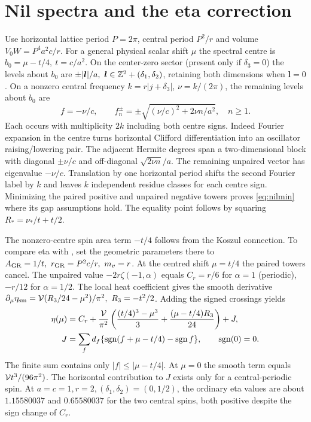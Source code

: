 \section{Nil spectra and the eta correction}\label{app:nil}
Use horizontal lattice period \(P=2\pi\), central period \(P^2/r\) and volume \(V_0W=P^4a^2c/r\). For a general physical scalar shift \(\mu\) the spectral centre is \(b_0=\mu-t/4,\ t=c/a^2\). On the center-zero sector (present only if \(\delta_3=0\)) the levels about \(b_0\) are \(\pm|\boldsymbol l|/a,\ \boldsymbol l\in\mathbb Z^2+(\delta_1,\delta_2)\), retaining both dimensions when \(\boldsymbol l=0\). On a nonzero central frequency \(k=r|j+\delta_3|\), \(\nu=k/(2\pi)\), the remaining levels about \(b_0\) are
\[
 f=-\nu/c,\qquad f_n^\pm=\pm\sqrt{(\nu/c)^2+2\nu n/a^2},\quad n\ge1.
\]
Each occurs with multiplicity \(2k\) including both centre signs. Indeed Fourier expansion in the centre turns horizontal Clifford differentiation into an oscillator raising/lowering pair. The adjacent Hermite degrees span a two-dimensional block with diagonal \(\pm\nu/c\) and off-diagonal \(\sqrt{2\nu n}/a\). The remaining unpaired vector has eigenvalue \(-\nu/c\). Translation by one horizontal period shifts the second Fourier label by \(k\) and leaves \(k\) independent residue classes for each centre sign. Minimizing the paired positive and unpaired negative towers proves \eqref{eq:nilmin} where its gap assumptions hold. The equality point follows by squaring \(R_*=\nu_*/t+t/2\).

The nonzero-centre spin area term \(-t/4\) follows from the Koszul connection. To compare eta with \cite[Thm.~12]{gornet}, set the geometric parameters there to \(A_{\rm GR}=1/t,\ r_{\rm GR}=P^2c/r,\ m_v=r\). At the centred shift \(\mu=t/4\) the paired towers cancel. The unpaired value \(-2r\zeta(-1,\alpha)\) equals \(C_r=r/6\) for \(\alpha=1\) (periodic), \(-r/12\) for \(\alpha=1/2\). The local heat coefficient gives the smooth derivative \(\partial_\mu\eta_{\rm sm}=\mathcal V(R_3/24-\mu^2)/\pi^2,\ R_3=-t^2/2\). Adding the signed crossings yields
\begin{align*}
 \eta(\mu)&=C_r+\frac{\mathcal V}{\pi^2}\left(\frac{(t/4)^3-\mu^3}{3}
                     +\frac{(\mu-t/4)R_3}{24}\right)+J,\\
 J&=\sum_f d_f\{\operatorname{sgn}(f+\mu-t/4)-\operatorname{sgn} f\},\qquad \operatorname{sgn}(0)=0 .
\end{align*}
The finite sum contains only \(|f|\le|\mu-t/4|\). At \(\mu=0\) the smooth term equals \(\mathcal V t^3/(96\pi^2)\). The horizontal contribution to \(J\) exists only for a central-periodic spin. At \(a=c=1,r=2,(\delta_1,\delta_2)=(0,1/2)\), the ordinary eta values are about \(1.15580037\) and \(0.65580037\) for the two central spins, both positive despite the sign change of \(C_r\).
